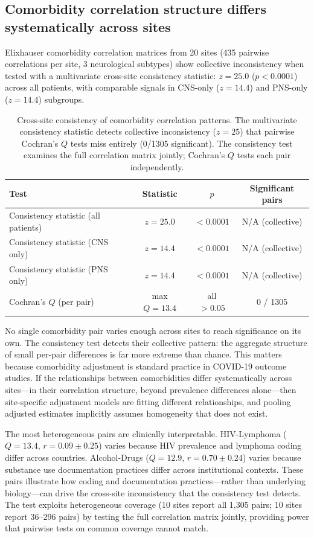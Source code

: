 \documentclass{article}
\begin{document}
\subsection{Comorbidity correlation structure differs systematically across sites}

Elixhauser comorbidity correlation matrices \cite{elixhauser1998} from 20 sites (435 pairwise correlations per site, 3 neurological subtypes) show collective inconsistency when tested with a multivariate cross-site consistency statistic: $z = 25.0$ ($p < 0.0001$) across all patients, with comparable signals in CNS-only ($z = 14.4$) and PNS-only ($z = 14.4$) subgroups.

\begin{table}[t]
\centering
\caption{Cross-site consistency of comorbidity correlation patterns. The multivariate consistency statistic detects collective inconsistency ($z = 25$) that pairwise Cochran's $Q$ tests miss entirely (0/1305 significant). The consistency test examines the full correlation matrix jointly; Cochran's $Q$ tests each pair independently.}
\label{tab:consistency}
\begin{tabular}{lccc}
\toprule
Test & Statistic & $p$ & Significant pairs \\
\midrule
Consistency statistic (all patients) & $z = 25.0$ & $< 0.0001$ & N/A (collective) \\
Consistency statistic (CNS only) & $z = 14.4$ & $< 0.0001$ & N/A (collective) \\
Consistency statistic (PNS only) & $z = 14.4$ & $< 0.0001$ & N/A (collective) \\
Cochran's $Q$ (per pair) & max $Q = 13.4$ & all $> 0.05$ & 0 / 1305 \\
\bottomrule
\end{tabular}
\end{table}

No single comorbidity pair varies enough across sites to reach significance on its own.
The consistency test detects their collective pattern: the aggregate structure of small per-pair differences is far more extreme than chance.
This matters because comorbidity adjustment is standard practice in COVID-19 outcome studies.
If the relationships between comorbidities differ systematically across sites---in their correlation structure, beyond prevalence differences alone---then site-specific adjustment models are fitting different relationships, and pooling adjusted estimates implicitly assumes homogeneity that does not exist.

The most heterogeneous pairs are clinically interpretable.
HIV-Lymphoma ($Q = 13.4$, $r = 0.09 \pm 0.25$) varies because HIV prevalence and lymphoma coding differ across countries.
Alcohol-Drugs ($Q = 12.9$, $r = 0.70 \pm 0.24$) varies because substance use documentation practices differ across institutional contexts.
These pairs illustrate how coding and documentation practices---rather than underlying biology---can drive the cross-site inconsistency that the consistency test detects.
The test exploits heterogeneous coverage (10 sites report all 1,305 pairs; 10 sites report 36--296 pairs) by testing the full correlation matrix jointly, providing power that pairwise tests on common coverage cannot match.
\end{document}

